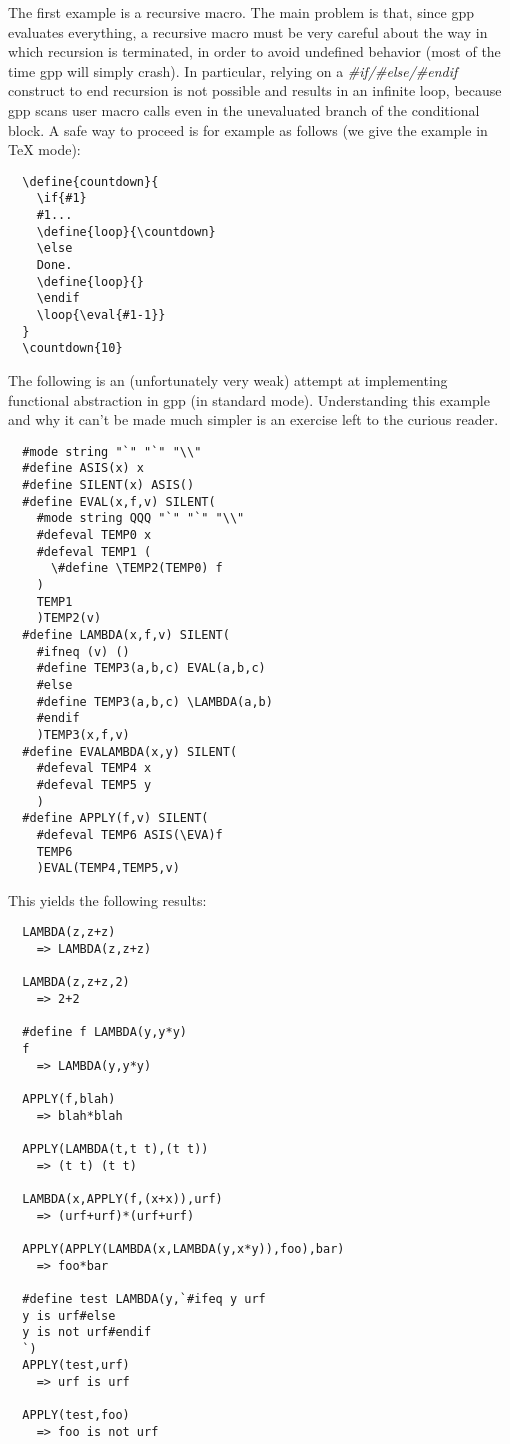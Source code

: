 The first example is a recursive macro. The main problem is that, since gpp
evaluates everything, a recursive macro must be very careful about the way
in which recursion is terminated, in order to avoid undefined behavior (most
of the time gpp will simply crash). In particular, relying on a
{\it \#if/\#else/\#endif} construct to end recursion is not possible and results
in an infinite loop, because gpp scans user macro calls even in the
unevaluated branch of the conditional block. A safe way to proceed is for
example as follows (we give the example in TeX mode):
\begin{verbatim}
  \define{countdown}{
    \if{#1}
    #1...
    \define{loop}{\countdown}
    \else
    Done.
    \define{loop}{}
    \endif
    \loop{\eval{#1-1}}
  }
  \countdown{10}
\end{verbatim}
The following is an (unfortunately very weak) attempt at implementing 
functional abstraction in gpp (in standard mode). Understanding this
example and why it can't be made much simpler is an exercise left to the 
curious reader.
\begin{verbatim}
  #mode string "`" "`" "\\"
  #define ASIS(x) x
  #define SILENT(x) ASIS()
  #define EVAL(x,f,v) SILENT(
    #mode string QQQ "`" "`" "\\"
    #defeval TEMP0 x
    #defeval TEMP1 (
      \#define \TEMP2(TEMP0) f
    )
    TEMP1
    )TEMP2(v)
  #define LAMBDA(x,f,v) SILENT(
    #ifneq (v) ()
    #define TEMP3(a,b,c) EVAL(a,b,c)
    #else
    #define TEMP3(a,b,c) \LAMBDA(a,b)
    #endif
    )TEMP3(x,f,v)
  #define EVALAMBDA(x,y) SILENT(
    #defeval TEMP4 x
    #defeval TEMP5 y
    ) 
  #define APPLY(f,v) SILENT(
    #defeval TEMP6 ASIS(\EVA)f
    TEMP6
    )EVAL(TEMP4,TEMP5,v)
\end{verbatim}
This yields the following results:
\begin{verbatim}
  LAMBDA(z,z+z)
    => LAMBDA(z,z+z)

  LAMBDA(z,z+z,2)
    => 2+2

  #define f LAMBDA(y,y*y)
  f
    => LAMBDA(y,y*y)

  APPLY(f,blah)
    => blah*blah

  APPLY(LAMBDA(t,t t),(t t))
    => (t t) (t t)

  LAMBDA(x,APPLY(f,(x+x)),urf)
    => (urf+urf)*(urf+urf)

  APPLY(APPLY(LAMBDA(x,LAMBDA(y,x*y)),foo),bar)
    => foo*bar

  #define test LAMBDA(y,`#ifeq y urf
  y is urf#else
  y is not urf#endif
  `)
  APPLY(test,urf)
    => urf is urf

  APPLY(test,foo)
    => foo is not urf
\end{verbatim}
